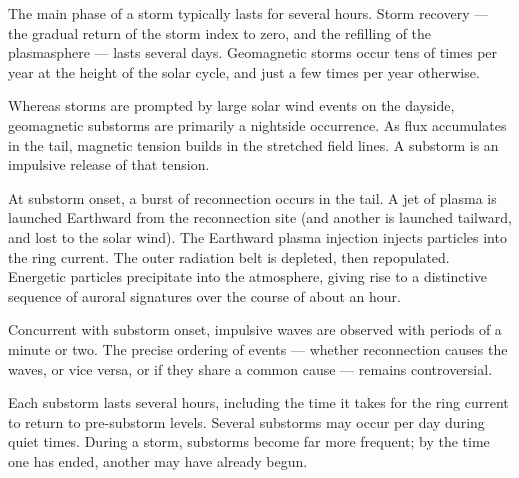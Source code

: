 The main phase of a storm typically lasts for several hours. Storm recovery ---
the gradual return of the storm index to zero, and the refilling of the
plasmasphere --- lasts several days. Geomagnetic storms occur tens of times per
year at the height of the solar cycle, and just a few times per year otherwise. 

Whereas storms are prompted by large solar wind events on the dayside,
geomagnetic substorms are primarily a nightside occurrence. As flux accumulates
in the tail, magnetic tension builds in the stretched field lines. A substorm
is an impulsive release of that tension. 


At substorm onset, a burst of reconnection occurs in the tail. A jet of plasma
is launched Earthward from the reconnection site (and another is launched
tailward, and lost to the solar wind). The Earthward plasma injection injects
particles into the ring current. The outer radiation belt is depleted, then
repopulated. Energetic particles precipitate into the atmosphere, giving rise
to a distinctive sequence of auroral signatures over the course of about an
hour. 

Concurrent with substorm onset, impulsive \Alfven waves are observed with
periods of a minute or two. The precise ordering of events --- whether
reconnection causes the waves, or vice versa, or if they share a common cause
--- remains controversial. 

Each substorm lasts several hours, including the time it takes for the ring
current to return to pre-substorm levels. Several substorms may occur per day
during quiet times. During a storm, substorms become far more frequent; by the
time one has ended, another may have already begun. 






